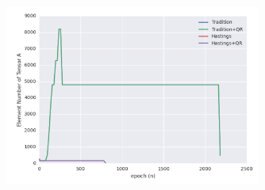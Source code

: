 \begin{figure}[ht]
	\centering
	\includegraphics[width=0.75\textwidth]{figures/fig327.png}
	\caption[Per epoch energy of Heisenberg model on 2d square lattice with dynamic truncation error]{}
	\label{fig327}
\end{figure}
